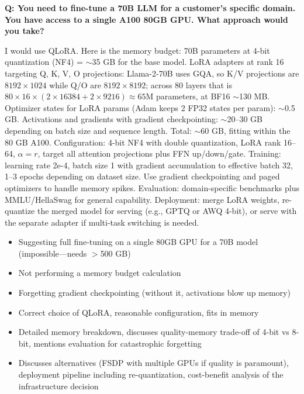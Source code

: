 \begin{interviewq}
\textbf{Q: You need to fine-tune a 70B LLM for a customer's specific domain. You have access to a single A100 80GB GPU. What approach would you take?}

 \quad {} \quad \badgefreq{\freqhigh}

\stronganswer I would use QLoRA. Here is the memory budget: 70B parameters at 4-bit quantization (NF4) = $\sim$35 GB for the base model. LoRA adapters at rank 16 targeting Q, K, V, O projections: Llama-2-70B uses GQA, so K/V projections are $8192 \times 1024$ while Q/O are $8192 \times 8192$; across 80 layers that is $80 \times 16 \times (2 \times 16384 + 2 \times 9216) \approx 65$M parameters, at BF16 $\sim$130 MB. Optimizer states for LoRA params (Adam keeps 2 FP32 states per param): $\sim$0.5 GB. Activations and gradients with gradient checkpointing: $\sim$20--30 GB depending on batch size and sequence length. Total: $\sim$60 GB, fitting within the 80 GB A100. Configuration: 4-bit NF4 with double quantization, LoRA rank 16--64, $\alpha = r$, target all attention projections plus FFN up/down/gate. Training: learning rate 2e-4, batch size 1 with gradient accumulation to effective batch 32, 1--3 epochs depending on dataset size. Use gradient checkpointing and paged optimizers to handle memory spikes. Evaluation: domain-specific benchmarks plus MMLU/HellaSwag for general capability. Deployment: merge LoRA weights, re-quantize the merged model for serving (e.g., GPTQ or AWQ 4-bit), or serve with the separate adapter if multi-task switching is needed.

\redflags
\begin{itemize}
    \item Suggesting full fine-tuning on a single 80GB GPU for a 70B model (impossible---needs $>$500 GB)
    \item Not performing a memory budget calculation
    \item Forgetting gradient checkpointing (without it, activations blow up memory)
\end{itemize}


\goodgreat
\begin{itemize}
    \item {} Correct choice of QLoRA, reasonable configuration, fits in memory
    \item {} Detailed memory breakdown, discusses quality-memory trade-off of 4-bit vs 8-bit, mentions evaluation for catastrophic forgetting
    \item {} Discusses alternatives (FSDP with multiple GPUs if quality is paramount), deployment pipeline including re-quantization, cost-benefit analysis of the infrastructure decision
\end{itemize}

\end{interviewq}

